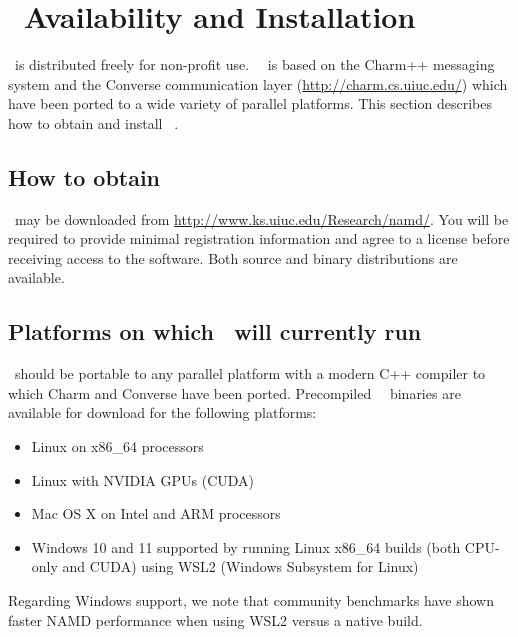 
\section{\NAMD\ Availability and Installation}
\label{section:avail}

\NAMD\ is distributed freely for non-profit use.
\NAMD\ \NAMDVER\ is based on the Charm++ messaging system and the
Converse communication layer (\url{http://charm.cs.uiuc.edu/})
which have been ported to a wide variety of parallel platforms.
This section describes how to obtain and install \NAMD\ \NAMDVER.

\subsection{How to obtain \NAMD}

\NAMD\ may be downloaded from \url{http://www.ks.uiuc.edu/Research/namd/}.
You will be required to provide minimal registration information and
agree to a license before receiving access to the software.
Both source and binary distributions are available.

\subsection{Platforms on which \NAMD\ will currently run}
\NAMD\ should be portable to any parallel platform with a
modern C++ compiler to which Charm and Converse have been ported.
Precompiled \NAMD\ \NAMDVER\ binaries are available for
download for the following platforms:  
\begin{itemize}
\item Linux on x86\_64 processors
\item Linux with NVIDIA GPUs (CUDA)
\item Mac OS X on Intel and ARM processors
\item Windows 10 and 11 supported by running Linux x86\_64 builds 
        (both CPU-only and CUDA) using WSL2 (Windows Subsystem for Linux)
\end{itemize}
Regarding Windows support, we note that community benchmarks have shown 
faster NAMD performance when using WSL2 versus a native build. 

